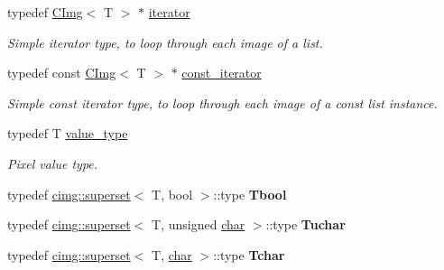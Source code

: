 \begin{DoxyCompactItemize}
\item 
typedef \hyperlink{structcimg__library__suffixed_1_1CImg}{C\+Img}$<$ T $>$ $\ast$ \hyperlink{structcimg__library__suffixed_1_1CImgList_a9d3e27da63f536e04fc7249f8e13dba0}{iterator}
\begin{DoxyCompactList}\small\item\em Simple iterator type, to loop through each image of a list. \end{DoxyCompactList}\item 
typedef const \hyperlink{structcimg__library__suffixed_1_1CImg}{C\+Img}$<$ T $>$ $\ast$ \hyperlink{structcimg__library__suffixed_1_1CImgList_aabe27c2b223cefcbdf081b4a7220a12c}{const\+\_\+iterator}
\begin{DoxyCompactList}\small\item\em Simple const iterator type, to loop through each image of a {\ttfamily const} list instance. \end{DoxyCompactList}\item 
typedef T \hyperlink{structcimg__library__suffixed_1_1CImgList_a41c952483793b049e58c27e11d0dd955}{value\+\_\+type}
\begin{DoxyCompactList}\small\item\em Pixel value type. \end{DoxyCompactList}\item 
\mbox{\label{structcimg__library__suffixed_1_1CImgList_adbc918d6001bebb2c58c29fd7a02e6dc}} 
typedef \hyperlink{namespacecimg__library__suffixed_1_1cimg_d5/d9e/structcimg__library__suffixed_1_1cimg_1_1superset}{cimg\+::superset}$<$ T, bool $>$\+::type {\bfseries Tbool}
\item 
\mbox{\label{structcimg__library__suffixed_1_1CImgList_ae0e7fd20ee83fc3894adf49228c4efc2}} 
typedef \hyperlink{namespacecimg__library__suffixed_1_1cimg_d5/d9e/structcimg__library__suffixed_1_1cimg_1_1superset}{cimg\+::superset}$<$ T, unsigned \hyperlink{classchar}{char} $>$\+::type {\bfseries Tuchar}
\item 
\mbox{\label{structcimg__library__suffixed_1_1CImgList_a698ba0821e5fdf35b768987e77816e06}} 
typedef \hyperlink{namespacecimg__library__suffixed_1_1cimg_d5/d9e/structcimg__library__suffixed_1_1cimg_1_1superset}{cimg\+::superset}$<$ T, \hyperlink{classchar}{char} $>$\+::type {\bfseries Tchar}

\end{DoxyCompactItemize}

